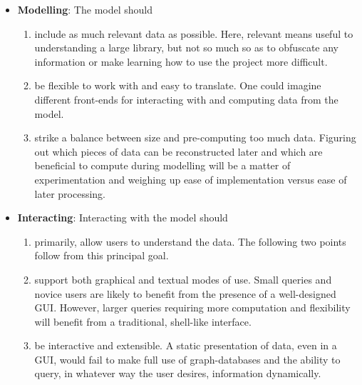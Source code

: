 \begin{itemize}

  \item \textbf{Modelling}: The model should
  \begin{enumerate}[label=\textbf{M\arabic*},ref={M\arabic*}]

    \item\label{req:m1} include as much relevant data as possible. Here,
      relevant means useful to understanding a large library, but not so much
      so as to obfuscate any information or make learning how to use the
      project more difficult.

    \item\label{req:m2} be flexible to work with and easy to translate. One
      could imagine different front-ends for interacting with and computing
      data from the model.

    \item\label{req:m3} strike a balance between size and pre-computing too much
      data. Figuring out which pieces of data can be reconstructed later and
      which are beneficial to compute during modelling will be a matter of
      experimentation and weighing up ease of implementation versus ease of
      later processing.

  \end{enumerate}

  \item \textbf{Interacting}: Interacting with the model should
  \begin{enumerate}[label=\textbf{I\arabic*},ref={I\arabic*}]

    \item\label{req:i1} primarily, allow users to understand the data. The
      following two points follow from this principal goal.

    \item\label{req:i2} support both graphical and textual modes of use. Small
      queries and novice users are likely to benefit from the presence of a
      well-designed GUI\@. However, larger queries requiring more computation
      and flexibility will benefit from a traditional, shell-like interface.

    \item\label{req:i3} be interactive and extensible. A static presentation of
      data, even in a GUI, would fail to make full use of graph-databases and
      the ability to query, in whatever way the user desires, information
      dynamically.


\end{enumerate}
\end{itemize}
